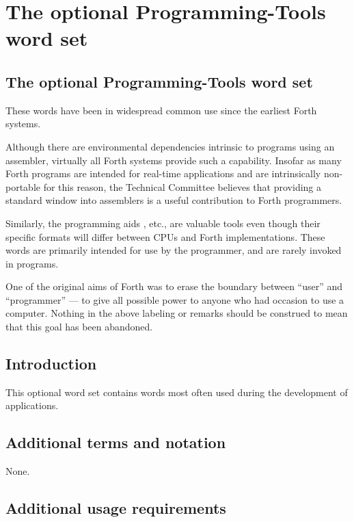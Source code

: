 \chapter{The optional Programming-Tools word set} %

\begin{info}
\section{The optional Programming-Tools word set} %

These words have been in widespread common use since the earliest
Forth systems.

Although there are environmental dependencies intrinsic to programs
using an assembler, virtually all Forth systems provide such a
capability. Insofar as many Forth programs are intended for real-time
applications and are intrinsically non-portable for this reason, the
Technical Committee believes that providing a standard window into
assemblers is a useful contribution to Forth programmers.

Similarly, the programming aids , etc., are valuable tools
even though their specific formats will differ between CPUs and Forth
implementations. These words are primarily intended for use by the
programmer, and are rarely invoked in programs.

One of the original aims of Forth was to erase the boundary between
``user'' and ``programmer'' --- to give all possible power to anyone
who had occasion to use a computer. Nothing in the above labeling or
remarks should be construed to mean that this goal has been abandoned.

\end{info}

\section{Introduction} %

This optional word set contains words most often used during the
development of applications.

\section{Additional terms and notation} %

None.

\section{Additional usage requirements} %

